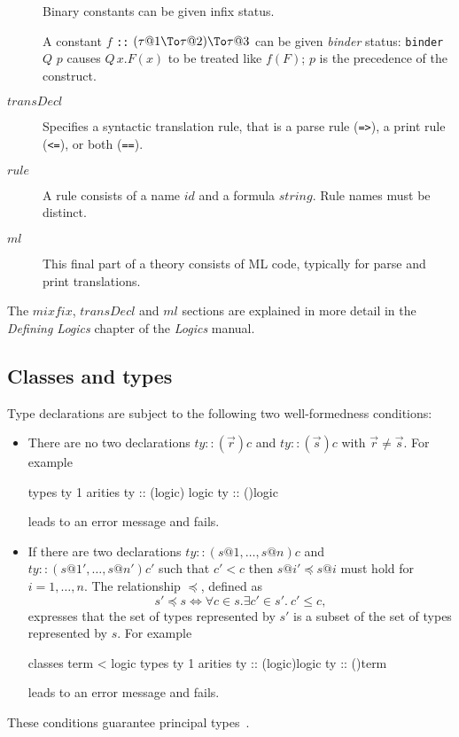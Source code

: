 \begin{description}
  Binary constants can be given infix status.

  A constant $f$ {\tt::} $(\tau@1\To\tau@2)\To\tau@3$ can be given {\em
    binder} status: {\tt binder} $Q$ $p$ causes $Q\,x.F(x)$ to be treated
  like $f(F)$; $p$ is the precedence of the construct.
\item[$transDecl$] Specifies a syntactic translation rule, that is a parse 
  rule ({\tt =>}), a print rule ({\tt <=}), or both ({\tt ==}).
\item[$rule$] A rule consists of a name $id$ and a formula $string$.  Rule
  names must be distinct.
\item[$ml$] This final part of a theory consists of ML code, 
  typically for parse and print translations.
\end{description}
The $mixfix$, $transDecl$ and $ml$ sections are explained in more detail in 
the {\it Defining Logics} chapter of the {\it Logics} manual.


\subsection{Classes and types}

Type declarations are subject to the following two well-formedness
conditions:
\begin{itemize}
\item There are no two declarations $ty :: (\vec{r})c$ and $ty :: (\vec{s})c$
  with $\vec{r} \neq \vec{s}$.  For example
\begin{ttbox}
types ty 1
arities ty :: ({\ttlbrace}logic{\ttrbrace}) logic
        ty :: ({\ttlbrace}{\ttrbrace})logic
\end{ttbox}
leads to an error message and fails.
\item If there are two declarations $ty :: (s@1,\dots,s@n)c$ and $ty ::
  (s@1',\dots,s@n')c'$ such that $c' < c$ then $s@i' \preceq s@i$ must hold
  for $i=1,\dots,n$.  The relationship $\preceq$, defined as
\[ s' \preceq s \iff \forall c\in s. \exists c'\in s'.~ c'\le c, \]
expresses that the set of types represented by $s'$ is a subset of the set of
types represented by $s$.  For example
\begin{ttbox}
classes term < logic
types ty 1
arities ty :: ({\ttlbrace}logic{\ttrbrace})logic
        ty :: ({\ttlbrace}{\ttrbrace})term
\end{ttbox}
leads to an error message and fails.
\end{itemize}
These conditions guarantee principal types~\cite{nipkow-prehofer}.


